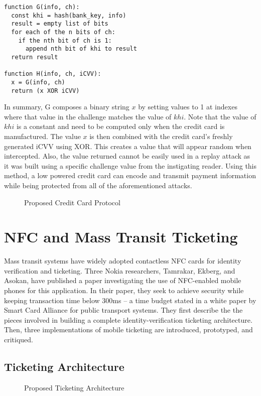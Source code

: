 \documentclass{sig-alternate}
\begin{document}
\begin{lstlisting}
function G(info, ch):
  const khi = hash(bank_key, info)
  result = empty list of bits
  for each of the n bits of ch:
    if the nth bit of ch is 1:
      append nth bit of khi to result
  return result

function H(info, ch, iCVV):
  x = G(info, ch)
  return (x XOR iCVV)
\end{lstlisting}

In summary, G composes a binary string $x$ by setting values to 1 at indexes where that value in the challenge matches the value of $khi$. Note that the value of $khi$ is a constant and need to be computed only when the credit card is manufactured. The value $x$ is then combined with the credit card's freshly generated iCVV using XOR. This creates a value that will appear random when intercepted. Also, the value returned cannot be easily used in a replay attack as it was built using a specific challenge value from the instigating reader. Using this method, a low powered credit card can encode and transmit payment information while being protected from all of the aforementioned attacks.

\begin{figure}
\centering
{}
\caption{Proposed Credit Card Protocol~\cite{CC2016}}
\label{fig:secureCC}
\end{figure}


\section{NFC and Mass Transit Ticketing}
\label{sec:mobile}

Mass transit systems have widely adopted contactless NFC cards for identity verification and ticketing. Three Nokia researchers, Tamrakar, Ekberg, and Asokan, have published a paper investigating the use of NFC-enabled mobile phones for this application. In their paper, they seek to achieve security while keeping transaction time below 300ms -- a time budget stated in a white paper by Smart Card Alliance for public transport systems.
They first describe the the pieces involved in building a complete identity-verification ticketing architecture. Then, three implementations of mobile ticketing are introduced, prototyped, and critiqued.~\cite{Ticket2011}

\subsection{Ticketing Architecture}
\begin{figure}
\centering
{}
\caption{Proposed Ticketing Architecture~\cite{Ticket2011}}
\label{fig:ticketingArch}
\end{figure}
\end{document}
